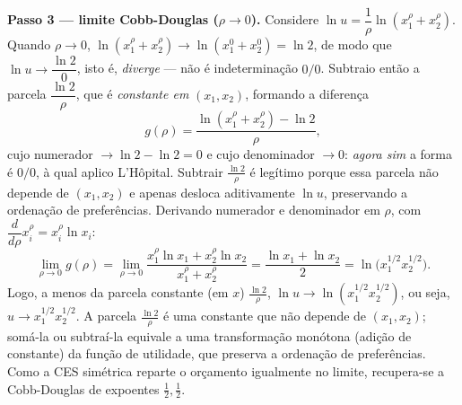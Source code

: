 \begin{solucao}
\textbf{Passo 3 --- limite Cobb-Douglas ($\rho\to 0$).} Considere $\ln u=\dfrac{1}{\rho}\ln(x_1^{\rho}+x_2^{\rho})$. Quando $\rho\to 0$, $\ln(x_1^{\rho}+x_2^{\rho})\to\ln(x_1^{0}+x_2^{0})=\ln 2$, de modo que $\ln u\to\dfrac{\ln 2}{0}$, isto é, \emph{diverge} --- não é indeterminação $0/0$. Subtraio então a parcela $\dfrac{\ln 2}{\rho}$, que é \emph{constante em} $(x_1,x_2)$, formando a diferença
\[
g(\rho)=\frac{\ln(x_1^{\rho}+x_2^{\rho})-\ln 2}{\rho},
\]
cujo numerador $\to \ln 2-\ln 2=0$ e cujo denominador $\to 0$: \emph{agora sim} a forma é $0/0$, à qual aplico L'Hôpital. Subtrair $\tfrac{\ln 2}{\rho}$ é legítimo porque essa parcela não depende de $(x_1,x_2)$ e apenas desloca aditivamente $\ln u$, preservando a ordenação de preferências. Derivando numerador e denominador em $\rho$, com $\dfrac{d}{d\rho}x_i^{\rho}=x_i^{\rho}\ln x_i$:
\[
\lim_{\rho\to 0}g(\rho)=\lim_{\rho\to 0}\frac{x_1^{\rho}\ln x_1+x_2^{\rho}\ln x_2}{x_1^{\rho}+x_2^{\rho}}=\frac{\ln x_1+\ln x_2}{2}=\ln\!\big(x_1^{1/2}x_2^{1/2}\big).
\]
Logo, a menos da parcela constante (em $x$) $\tfrac{\ln 2}{\rho}$, $\ln u\to \ln(x_1^{1/2}x_2^{1/2})$, ou seja, $u\to x_1^{1/2}x_2^{1/2}$. A parcela $\tfrac{\ln 2}{\rho}$ é uma constante que não depende de $(x_1,x_2)$; somá-la ou subtraí-la equivale a uma transformação monótona (adição de constante) da função de utilidade, que preserva a ordenação de preferências. Como a CES simétrica reparte o orçamento igualmente no limite, recupera-se a Cobb-Douglas de expoentes $\tfrac12,\tfrac12$.


\end{solucao}
